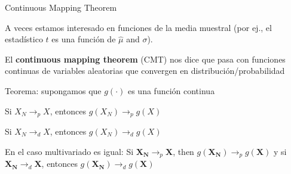 \documentclass[11pt,handout,aspectratio=169]{beamer}
\newenvironment{wideitemize}{\itemize\addtolength{\itemsep}{10pt}}{\enditemize}
\begin{document}
\begin{frame}{Continuous Mapping Theorem}

\begin{wideitemize}	

\item
A veces estamos interesado en funciones de la media muestral (por ej., el estadístico $t$ es una función de $\hat\mu$ and $\sigma$).

\pause
\item
El \textbf{continuous mapping theorem} (CMT) nos dice que pasa con funciones continuas de variables aleatorias que convergen en distribución/probabilidad

\pause
\item
Teorema: supongamos que $g(\cdot)$ es una función continua\\
\vspace{.2cm}

Si $X_N \rightarrow_p X$, entonces $g(X_N) \rightarrow_p g(X)$ \\
\vspace{.2cm}
\pause

Si $X_N \rightarrow_d X$, entonces $g(X_N) \rightarrow_d g(X)$\\
\vspace{0.2cm}
\pause{}

En el caso multivariado es igual: Si $\mathbf{X_N} \rightarrow_p \mathbf{X}$, then $g(\mathbf{X_N}) \rightarrow_p g(\mathbf{X})$ y si $\mathbf{X_N} \rightarrow_d \mathbf{X}$, entonces $g(\mathbf{X_N}) \rightarrow_d g(\mathbf{X})$

\end{wideitemize}

\end{frame}
\end{document}
